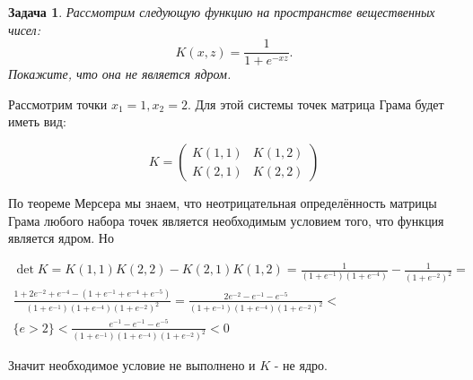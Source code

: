 \documentclass[12pt,fleqn]{article}
\newtheorem{esProblem}{Задача}
\begin{document}
\begin{esProblem}
    Рассмотрим следующую функцию на пространстве вещественных чисел:
    \[
        K(x, z) = \frac{1}{1 + e^{-xz}}.
    \]
    Покажите, что она не является ядром.
\end{esProblem}

\begin{esSolution}

    Рассмотрим точки $x_1 = 1, x_2 = 2$. Для этой системы точек матрица Грама будет иметь вид: 
    
    \begin{equation*}
        K = 
        \begin{pmatrix}
            K(1, 1) & K(1, 2) \\
            K(2, 1) & K(2, 2)
        \end{pmatrix}
    \end{equation*}

    По теореме Мерсера мы знаем, что неотрицательная определённость матрицы Грама любого набора точек является необходимым условием того, что функция является ядром. Но 
    
    \begin{gather*}
        \det K = K(1, 1)K(2, 2) - K(2, 1)K(1, 2) = 
        \frac{1}{(1 + e^{-1})(1 + e^{-4})} - \frac{1}{(1 + e^{-2})^2} = 
        \\
        \frac{1 + 2 e^{-2} + e^{-4} - (1 + e^{-1} + e^{-4} + e^{-5})}{(1 + e^{-1})(1 + e^{-4})(1 + e^{-2})^2} = 
        \frac{2e^{-2} - e^{-1} - e^{-5}}{(1 + e^{-1})(1 + e^{-4})(1 + e^{-2})^2}  < \\
        \{e > 2\} < 
        \frac{e^{-1} - e^{-1} - e^{-5}}{(1 + e^{-1})(1 + e^{-4})(1 + e^{-2})^2} < 0
    \end{gather*}
    
    Значит необходимое условие не выполнено и $K$ - не ядро.
    
\end{esSolution}
\end{document}
